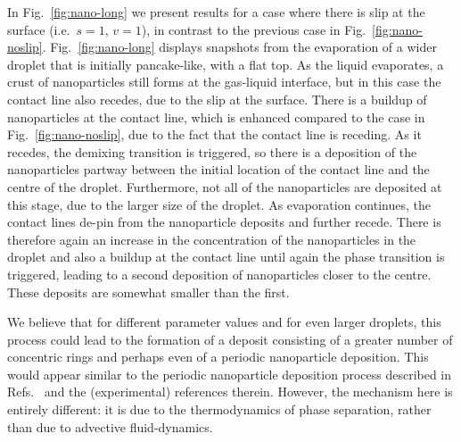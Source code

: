 \documentclass[journal=langd5,manuscript=article]{achemso}
\begin{document}
In Fig.~\ref{fig:nano-long} we present results for a case where there is slip at the surface (i.e.\ $s=1$, $v=1$), in contrast to the previous case in {Fig.\ \ref{fig:nano-noslip}.} Fig.~\ref{fig:nano-long} displays snapshots from the evaporation of a wider droplet that is initially pancake-like, with a flat top. As the liquid evaporates, a crust of nanoparticles still forms at the gas-liquid interface, but in this case the contact line also recedes, due to the slip at the surface. There is a buildup of nanoparticles at the contact line, which is enhanced compared to the case in {Fig.\ \ref{fig:nano-noslip}}, due to the fact that the contact line is receding. As it recedes, the demixing transition is triggered, so there is a deposition of the nanoparticles partway between the initial location of the contact line and the centre of the droplet. Furthermore, not all of the nanoparticles are deposited at this stage, due to the larger size of the droplet. As evaporation continues, the contact lines de-pin from the nanoparticle deposits and further recede. There is therefore again an increase in the concentration of the nanoparticles in the droplet and also a buildup at the contact line until again the phase transition is triggered, leading to a second deposition of nanoparticles closer to the centre. These deposits are somewhat smaller than the first.

We believe that for different parameter values and for even larger droplets, this process could lead to the formation of a deposit consisting of a greater number of concentric rings and perhaps even of a periodic nanoparticle deposition. This would appear similar to the periodic nanoparticle deposition process described in Refs.\  and the (experimental) references therein. However, the mechanism here is entirely different: it is due to the thermodynamics of phase separation, rather than due to advective fluid-dynamics.
\end{document}
